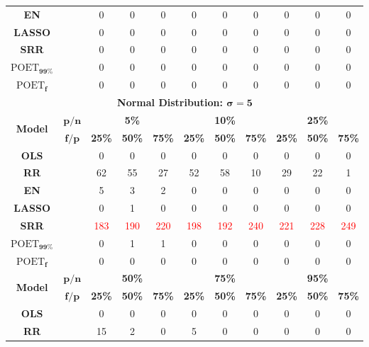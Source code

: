 \begin{table}[ht!]
{\begin{tabular*}{\textwidth}{@{\extracolsep{\fill}}ccccccccccc@{}}
\textbf{EN} &  & 0 & 0 & 0 & 0 & 0 & 0 & 0 & 0 & 0 \\
\textbf{LASSO} &  & 0 & 0 & 0 & 0 & 0 & 0 & 0 & 0 & 0 \\
\textbf{SRR} &  & 0 & 0 & 0 & 0 & 0 & 0 & 0 & 0 & 0 \\
\textbf{$\text{POET}_{\bm{99\%}}$} &  & 0 & 0 & 0 & 0 & 0 & 0 & 0 & 0 & 0 \\
\textbf{$\text{POET}_{\bm{f}}$} &  & 0 & 0 & 0 & 0 & 0 & 0 & 0 & 0 & 0 \\
\midrule
\multicolumn{11}{c}{\textbf{Normal Distribution: $\bm\sigma=\textbf{5}$}}\\
\midrule
\multirow{2}{*}{\textbf{Model}} & $\bm{p/n}$ & \multicolumn{3}{c}{\textbf{5\%}} & \multicolumn{3}{c}{\textbf{10\%}} & \multicolumn{3}{c}{\textbf{25\%}} \\
\cmidrule{3-5}
\cmidrule{6-8}
\cmidrule{9-11}
\multirow{2}{*}{} & $\bm{f/p}$ & \textbf{25\%} & \textbf{50\%} & \textbf{75\%} & \textbf{25\%} & \textbf{50\%} & \textbf{75\%} & \textbf{25\%} & \textbf{50\%} & \textbf{75\%} \\
\midrule
\textbf{OLS} &  & 0 & 0 & 0 & 0 & 0 & 0 & 0 & 0 & 0 \\
\textbf{RR} &  & 62 & 55 & 27 & 52 & 58 & 10 & 29 & 22 & 1 \\
\textbf{EN} &  & 5 & 3 & 2 & 0 & 0 & 0 & 0 & 0 & 0 \\
\textbf{LASSO} &  & 0 & 1 & 0 & 0 & 0 & 0 & 0 & 0 & 0 \\
\textbf{SRR} &  & \textcolor{red}{183} & \textcolor{red}{190} & \textcolor{red}{220} & \textcolor{red}{198} & \textcolor{red}{192} & \textcolor{red}{240} & \textcolor{red}{221} & \textcolor{red}{228} & \textcolor{red}{249} \\
\textbf{$\text{POET}_{\bm{99\%}}$} &  & 0 & 1 & 1 & 0 & 0 & 0 & 0 & 0 & 0 \\
\textbf{$\text{POET}_{\bm{f}}$} &  & 0 & 0 & 0 & 0 & 0 & 0 & 0 & 0 & 0 \\
\midrule
\multirow{2}{*}{\textbf{Model}} & $\bm{p/n}$ & \multicolumn{3}{c}{\textbf{50\%}} & \multicolumn{3}{c}{\textbf{75\%}} & \multicolumn{3}{c}{\textbf{95\%}} \\
\cmidrule{3-5}
\cmidrule{6-8}
\cmidrule{9-11}
\multirow{2}{*}{} & $\bm{f/p}$ & \textbf{25\%} & \textbf{50\%} & \textbf{75\%} & \textbf{25\%} & \textbf{50\%} & \textbf{75\%} & \textbf{25\%} & \textbf{50\%} & \textbf{75\%} \\
\midrule
\textbf{OLS} &  & 0 & 0 & 0 & 0 & 0 & 0 & 0 & 0 & 0 \\
\textbf{RR} &  & 15 & 2 & 0 & 5 & 0 & 0 & 0 & 0 & 0 \\

\end{tabular*}}
\end{table}

